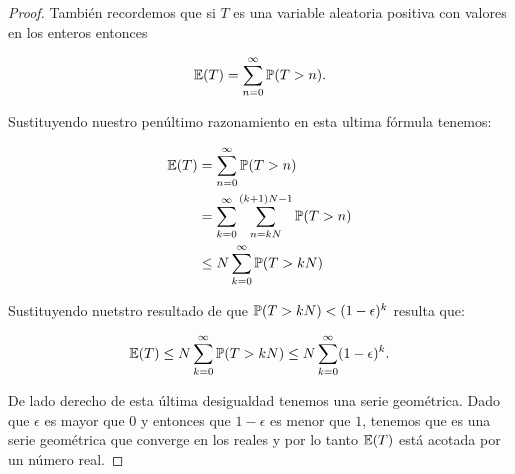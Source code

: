 \begin{proof}
	También recordemos que si $T$ es una variable aleatoria positiva con valores en los enteros entonces 
	
    \begin{align}
		\mathbb{E}(T) = \sum_{n=0}^{\infty} \mathbb{P}(T > n).
	\end{align}\pn
	
	Sustituyendo nuestro penúltimo razonamiento en esta ultima fórmula tenemos:
	
	\begin{align}
		\mathbb{E}(T) 	&= 		\sum_{n=0}^{\infty} \mathbb{P}(T > n) \\
				&= 		\sum_{k=0}^{\infty} \sum_{n = kN}^{(k+1)N -1} \mathbb{P}(T > n) \\
				&\leq 	N \sum_{k=0}^{\infty} \mathbb{P}(T > kN)
	\end{align}\pn
		
	Sustituyendo nuetstro resultado de que $\mathbb{P}(T>kN)<(1-\epsilon)^{k}$ resulta que:
    
	\begin{align}
		\mathbb{E}(T)\leq N \sum_{k=0}^{\infty} \mathbb{P}(T > kN) \leq N \sum_{k=0}^{\infty} (1-\epsilon)^k.
	\end{align}\pn
	
	De lado derecho de esta última desigualdad tenemos una serie geométrica. Dado que $\epsilon$ es mayor 
	que $0$ y entonces que $1-\epsilon$ es menor que $1$, tenemos que es una serie geométrica que converge 
	en los reales y por lo tanto $\mathbb{E}(T)$ está acotada por un número real.
\end{proof}	